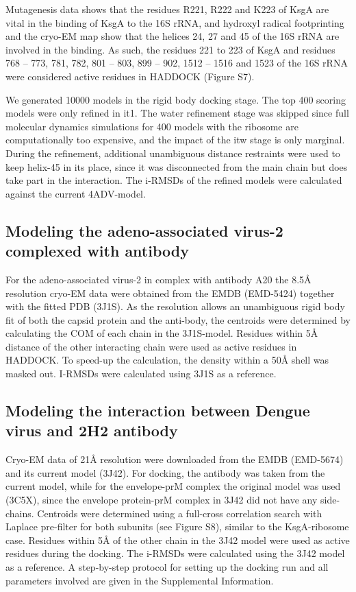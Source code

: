 Mutagenesis data shows that the residues R221, R222 and K223 of KsgA are vital in the binding of KsgA to the 16S rRNA, and hydroxyl radical footprinting and the cryo-EM map show that the helices 24, 27 and 45 of the 16S rRNA are involved in the binding. 
As such, the residues 221 to 223 of KsgA and residues 768 – 773, 781, 782, 801 – 803, 899 – 902, 1512 – 1516 and 1523 of the 16S rRNA were considered active residues in HADDOCK (Figure S7). 

We generated 10000 models in the rigid body docking stage. 
The top 400 scoring models were only refined in it1. 
The water refinement stage was skipped since full molecular dynamics simulations for 400 models with the ribosome are computationally too expensive, and the impact of the itw stage is only marginal. 
During the refinement, additional unambiguous distance restraints were used to keep helix-45 in its place, since it was disconnected from the main chain but does take part in the interaction. 
The i-RMSDs of the refined models were calculated against the current 4ADV-model.

\subsection{Modeling the adeno-associated virus-2 complexed with antibody}

For the adeno-associated virus-2 in complex with antibody A20 the 8.5Å resolution cryo-EM data were obtained from the EMDB (EMD-5424) together with the fitted PDB (3J1S). 
As the resolution allows an unambiguous rigid body fit of both the capsid protein and the anti-body, the centroids were determined by calculating the COM of each chain in the 3J1S-model. 
Residues within 5Å distance of the other interacting chain were used as active residues in HADDOCK. 
To speed-up the calculation, the density within a 50Å shell was masked out. 
I-RMSDs were calculated using 3J1S as a reference. 

\subsection{Modeling the interaction between Dengue virus and 2H2 antibody}

Cryo-EM data of 21Å resolution were downloaded from the EMDB (EMD-5674) and its current model (3J42). 
For docking, the antibody was taken from the current model, while for the envelope-prM complex the original model was used (3C5X), since the envelope protein-prM complex in 3J42 did not have any side-chains. 
Centroids were determined using a full-cross correlation search with Laplace pre-filter for both subunits (see Figure S8), similar to the KsgA-ribosome case. 
Residues within 5Å of the other chain in the 3J42 model were used as active residues during the docking. 
The i-RMSDs were calculated using the 3J42 model as a reference. 
A step-by-step protocol for setting up the docking run and all parameters involved are given in the Supplemental Information.

